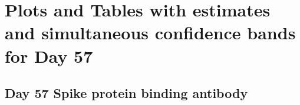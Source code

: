 \documentclass[]{book}
\theoremstyle{definition}
\theoremstyle{definition}
\theoremstyle{definition}
\newcommand{\1}{\mathbbm{1}}
\begin{document}
\newpage

\newpage

\hypertarget{plots-and-tables-with-estimates-and-simultaneous-confidence-bands-for-day-57}{%
\section{Plots and Tables with estimates and simultaneous confidence bands for Day 57}\label{plots-and-tables-with-estimates-and-simultaneous-confidence-bands-for-day-57}}

\newpage

\newpage

\hypertarget{day-57-spike-protein-binding-antibody-2}{%
\subsection{Day 57 Spike protein binding antibody}\label{day-57-spike-protein-binding-antibody-2}}
\end{document}
